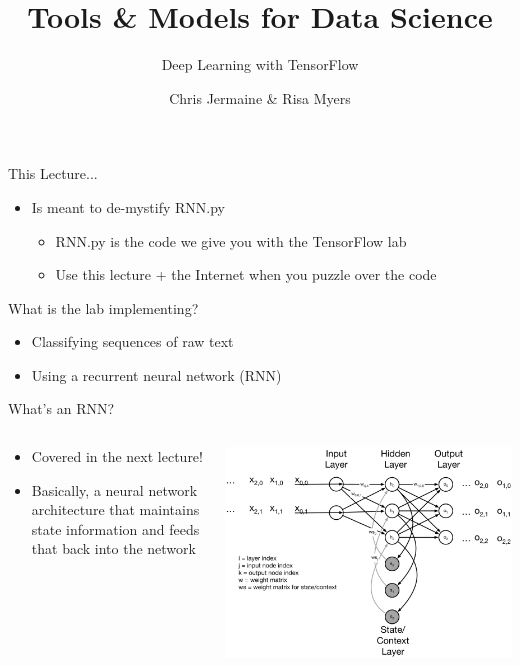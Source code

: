 \documentclass[aspectratio=169]{beamer}
\title[]
{Tools \& Models for Data Science}
\subtitle{Deep Learning with TensorFlow}
\author[]{Chris Jermaine \& Risa Myers}
\institute
{
  Rice University 
}
\date[]{}
\begin{document}
\begin{frame}
 \titlepage
\end{frame}
\begin{frame}{This Lecture...}

\begin{itemize}
        \item Is meant to de-mystify RNN.py
        \begin{itemize}
	\item RNN.py is the code we give you with the TensorFlow lab
        \item Use this lecture + the Internet when you puzzle over the code
        \end{itemize}

\end{itemize}
\end{frame}
\begin{frame}{What is the lab implementing?}

\begin{itemize}
        \item Classifying sequences of raw text
        \item Using a recurrent neural network    (RNN)
\end{itemize}
\end{frame}
\begin{frame}{What's an RNN?}

\begin{columns}
\begin{column}{0.5\textwidth}
\begin{itemize}
        \item Covered in the next lecture!
        \item Basically, a neural network architecture that  maintains state information and feeds that back into the network
\end{itemize}
\end{column}
\begin{column}{0.5\textwidth}
\includegraphics[width=1\textwidth]{lectRNN/Elman.pdf}
\end{column}
\end{columns}
\end{frame}
\end{document}
